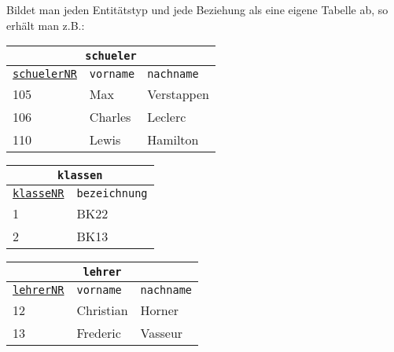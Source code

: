 Bildet man jeden Entitätstyp und jede Beziehung als eine eigene Tabelle ab, so erhält man z.B.:
\begin{minipage}{\textwidth}
	\begin{minipage}{0.5\textwidth}
		\begin{tabular}{lll}
			\multicolumn{3}{c}{\lstinline!schueler!}\\
			\hline
			\underline{\lstinline!schuelerNR!}&\lstinline!vorname!&\lstinline!nachname!\\
			\hline
			105&Max&Verstappen\\
			106&Charles&Leclerc\\
			110&Lewis&Hamilton\\
		\end{tabular}
	\end{minipage}%
	\begin{minipage}{0.5\textwidth}
		\begin{tabular}{ll}
			\multicolumn{2}{c}{\lstinline!klassen!}\\
			\hline
			\underline{\lstinline!klasseNR!}&\lstinline!bezeichnung!\\
			\hline
			1&BK22\\
			2&BK13\\
		\end{tabular}
	\end{minipage}%
\end{minipage}
\begin{minipage}{0.3\textwidth}
	\begin{tabular}{lll}
		\multicolumn{3}{c}{\lstinline!lehrer!}\\
		\hline
		\underline{\lstinline!lehrerNR!}&\lstinline!vorname!&\lstinline!nachname!\\
		\hline
		12&Christian&Horner\\
		13&Frederic&Vasseur\\
	\end{tabular}
\end{minipage}
